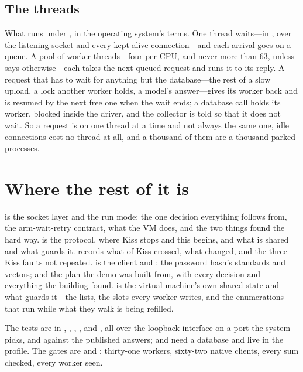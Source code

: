 \subsection{The threads}

What runs under , in the operating system's
terms. One thread waits---in , over the listening socket and
every kept-alive connection---and each arrival goes on a queue. A pool of
worker threads---four per CPU, and never more than 63, unless
 says otherwise---each takes the next queued request and runs
it to its reply. A request that has
to wait for anything but the database---the rest of a slow upload, a lock
another worker holds, a model's answer---gives its worker back and is
resumed by the next free one when the wait ends; a database call holds its
worker, blocked inside the driver, and the collector is told so that it
does not wait. So a request is on one thread at a time and not always the
same one, idle connections cost no thread at all, and a thousand of them
are a thousand parked processes.

\section{Where the rest of it is}

 is the socket layer and the run mode: the one decision
everything follows from, the arm-wait-retry contract, what the VM does, and
the two things found the hard way.  is the protocol,
where Kiss stops and this begins, and what is shared and what guards it.
 records what of Kiss crossed, what changed,
and the three Kiss faults not repeated.  is the
client and ;  the password hash's
standards and vectors; and  the plan the demo was built
from, with every decision and everything the building found.
 is the virtual machine's own shared state and what
guards it---the lists, the slots every worker writes, and the enumerations
that run while what they walk is being refilled.

The tests are in , ,
, , 
and , all over the loopback interface on a port the
system picks, and  against the published answers;
 and  need a
database and live in the  profile. The gates are
 and
: thirty-one workers, sixty-two native
clients, every sum checked, every worker seen.
